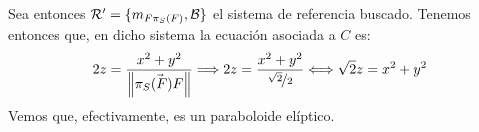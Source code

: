 \documentclass[12pt]{article}
\begin{document}
\begin{ejercicio}[2.5 puntos]
    Sea entonces $\mathcal{R}'=\{m_{F \pi_S(F)},\mathcal{B}\}$ el sistema de referencia buscado. Tenemos entonces que, en dicho sistema la ecuación asociada a $C$ es:
    \begin{equation*}
        2z = \frac{x^2+y^2}{\left\|\vec{\pi_S(F)F}\right\|} \Longrightarrow 2z = \frac{x^2+y^2}{\nicefrac{\sqrt{2}}{2}} \Longleftrightarrow \sqrt{2}z = x^2+y^2
    \end{equation*}
    Vemos que, efectivamente, es un paraboloide elíptico.
   \end{ejercicio} 
     
\end{document}
